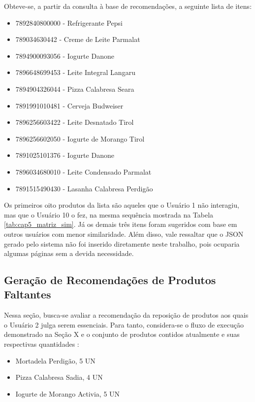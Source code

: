 Obteve-se, a partir da consulta à base de recomendações, a seguinte lista de itens:

\begin{itemize} \parskip -3pt
    \item 7892840800000 - Refrigerante Pepsi
    \item 789034630442 - Creme de Leite Parmalat
    \item 7894900093056 - Iogurte Danone
    \item 7896648699453 - Leite Integral Langaru
    \item 7894904326044 - Pizza Calabresa Seara
    \item 7891991010481 - Cerveja Budweiser
    \item 7896256603422 - Leite Desnatado Tirol
    \item 7896256602050 - Iogurte de Morango Tirol
    \item 7891025101376 - Iogurte Danone
    \item 7896034680010 - Leite Condensado Parmalat
    \item 7891515490430 - Lasanha Calabresa Perdigão
\end{itemize}


Os primeiros oito produtos da lista são aqueles que o Usuário 1 não interagiu, mas que o Usuário 10 o fez, na mesma sequência mostrada na Tabela \ref{tab:cap5_matriz_sim}. Já os demais três itens foram sugeridos com base em outros usuários com menor similaridade.
Além disso, vale ressaltar que o JSON gerado pelo sistema não foi inserido diretamente neste trabalho, pois ocuparia algumas páginas sem a devida necessidade.

\subsection{Geração de Recomendações de Produtos Faltantes}

Nessa seção, busca-se avaliar a recomendação da reposição de produtos aos quais o Usuário 2 julga serem essenciais. Para tanto, considera-se o fluxo de execução demonstrado na Seção X e o conjunto de produtos contidos atualmente e suas respectivas quantidades :

\begin{itemize} \parskip -3pt
    \item Mortadela Perdigão, 5 UN
    \item Pizza Calabresa Sadia, 4 UN
    \item Iogurte de Morango Activia, 5 UN
\end{itemize}

